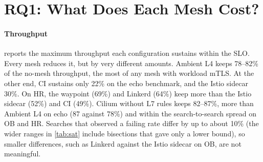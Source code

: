 
\section{RQ1: What Does Each Mesh Cost?}
\label{sec:rq1}

\paragraph{Throughput}
 reports the maximum throughput each configuration sustains
within the SLO. Every mesh reduces it, but by very different amounts. Ambient
L4 keeps 78--82\% of the no-mesh throughput, the most of any mesh with workload
mTLS. At the other end, CI sustains only 22\% on the echo benchmark, and
the Istio sidecar 30\%. On HR, the waypoint (69\%) and Linkerd (64\%)
keep more than the Istio sidecar (52\%) and CI (49\%). Cilium without L7
rules keeps 82--87\%, more than Ambient L4 on echo (87 against 78\%) and
within the search-to-search spread on OB and HR. Searches that observed a
failing rate differ by up to about 10\% (the wider ranges in \cref{tab:sat}
include bisections that gave only a lower bound), so smaller differences,
such as Linkerd against the Istio sidecar on OB, are not meaningful.

\begin{table}[t]
  \centering
  \caption{Maximum SLO-compliant throughput (req/s) and fraction of the
           no-mesh baseline: median of the searches whose boundary was
           observed, with the range over all searches of the cell (2--3
           searches, \cref{sec:load}).}
  \label{tab:sat}
  \footnotesize
  \setlength{\tabcolsep}{1.5pt}
  
\end{table}

